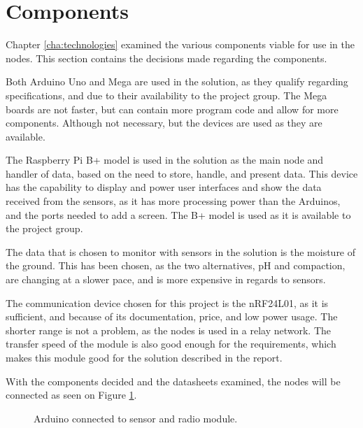 \section{Components}
Chapter \ref{cha:technologies} examined the various components viable for use in the nodes. This section contains the decisions made regarding the components.

Both Arduino Uno and Mega are used in the solution, as they qualify regarding specifications, and due to their availability to the project group. The Mega boards are not faster, but can contain more program code and allow for more components. Although not necessary, but the devices are used as they are available.

The Raspberry Pi B+ model is used in the solution as the main node and handler of data, based on the need to store, handle, and present data.  This device has the capability to display and power user interfaces and show the data received from the sensors, as it has more processing power than the Arduinos, and the ports needed to add a screen. The B+ model is used as it is available to the project group.

The data that is chosen to monitor with sensors in the solution is the moisture of the ground. This has been chosen, as the two alternatives, pH and compaction, are changing at a slower pace, and is more expensive in regards to sensors.

The communication device chosen for this project is the nRF24L01, as it is sufficient, and because of its documentation, price, and low power usage. The shorter range is not a problem, as the nodes is used in a relay network. The transfer speed of the module is also good enough for the requirements, which makes this module good for the solution described in the report.

With the components decided and the datasheets examined, the nodes will be connected as seen on Figure \ref{fig:compsketch}.

\begin{figure}[!h]
	\centering
	\caption{Arduino connected to sensor and radio module.}
	\label{fig:compsketch}
\end{figure}
